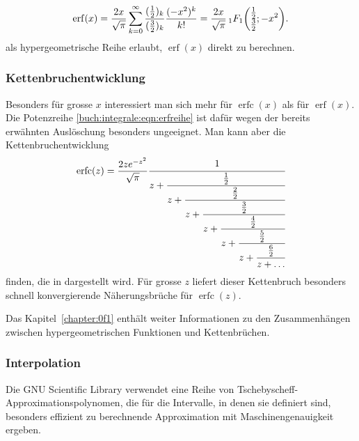 \[
\operatorname{erf}(x)
=
\frac{2x}{\sqrt{\pi}}\sum_{k=0}^\infty
\frac{(\frac12)_k}{(\frac32)_k}\frac{(-x^2)^k}{k!}
=
\frac{2x}{\sqrt{\pi}}\,
\mathstrut_1F_1\biggl(\begin{matrix}{\textstyle\frac12}\\{\textstyle\frac32}\end{matrix};-x^2\biggr).
\]
als hypergeometrische Reihe erlaubt, $\operatorname{erf}(x)$
direkt zu berechnen.

%
%
\subsubsection{Kettenbruchentwicklung}
Besonders für grosse $x$ interessiert man sich mehr für
$\operatorname{erfc}(x)$ als für $\operatorname{erf}(x)$.
Die Potenzreihe \eqref{buch:integrale:eqn:erfreihe} ist
dafür wegen der bereits erwähnten Auslöschung besonders ungeeignet.
Man kann aber die Kettenbruchentwicklung 
\begin{equation}
\operatorname{erfc}(z)
=
\frac{2ze^{-z^2}}{\sqrt{\pi}}
\cfrac{1}{
z+\cfrac{\frac12}{
z+\cfrac{\frac22}{
z+\cfrac{\frac32}{
z+\cfrac{\frac42}{
z+\cfrac{\frac52}{
z+\cfrac{\frac62}{
z+\dots}}}}}}}
\end{equation}
finden, die in \cite[p.~175]{buch:pade} dargestellt wird.
Für grosse $z$ liefert dieser Kettenbruch besonders schnell konvergierende
Näherungsbrüche für $\operatorname{erfc}(z)$.

Das Kapitel~\ref{chapter:0f1} enthält weiter Informationen zu
den Zusammenhängen zwischen hypergeometrischen Funktionen und
Kettenbrüchen.

%
%
\subsubsection{Interpolation}
Die GNU Scientific Library \cite{buch:library:gsl} verwendet eine Reihe von
Tschebyscheff-Approximationspolynomen, die für die Intervalle, in denen
sie definiert sind, besonders effizient zu berechnende Approximation
mit Maschinengenauigkeit ergeben.
